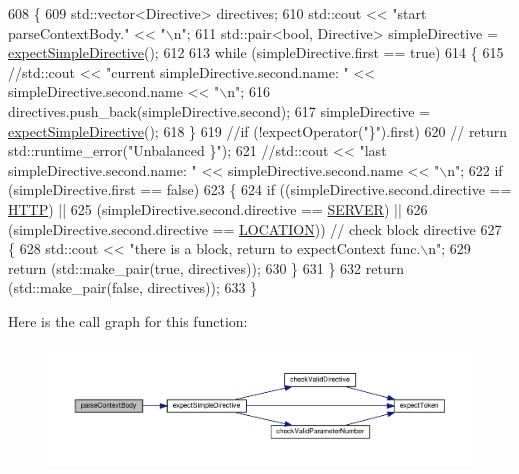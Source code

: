 \begin{DoxyCode}
608     \{
609         std::vector<Directive>  directives;
610         std::cout << \textcolor{stringliteral}{"start parseContextBody."} << \textcolor{stringliteral}{"\(\backslash\)n"};
611         std::pair<bool, Directive> simpleDirective = \hyperlink{classft_1_1_parser_a81d18b750d54e1e3002070531045171b}{expectSimpleDirective}();
612 
613         \textcolor{keywordflow}{while} (simpleDirective.first == \textcolor{keyword}{true})
614         \{
615             \textcolor{comment}{//std::cout << "current simpleDirective.second.name: " << simpleDirective.second.name << "\(\backslash\)n";}
616             directives.push\_back(simpleDirective.second);
617             simpleDirective = \hyperlink{classft_1_1_parser_a81d18b750d54e1e3002070531045171b}{expectSimpleDirective}();
618         \}
619         \textcolor{comment}{//if (!expectOperator("\}").first)}
620         \textcolor{comment}{//  return std::runtime\_error("Unbalanced \}");}
621         \textcolor{comment}{//std::cout << "last simpleDirective.second.name: " << simpleDirective.second.name << "\(\backslash\)n";}
622         \textcolor{keywordflow}{if} (simpleDirective.first == \textcolor{keyword}{false})
623         \{
624             \textcolor{keywordflow}{if} ((simpleDirective.second.directive == \hyperlink{namespaceft_a5a5554dff10f0dc50bae4cc5825ad75da67e044074f46e6cea22788527da5f02e}{HTTP}) ||
625                     (simpleDirective.second.directive == \hyperlink{namespaceft_a5a5554dff10f0dc50bae4cc5825ad75da67c96b24b23bcb408bae7626730a04b7}{SERVER}) ||
626                     (simpleDirective.second.directive == \hyperlink{namespaceft_a5a5554dff10f0dc50bae4cc5825ad75da1e9e3944b93fde52c7c92e1e15dcaf4a}{LOCATION})) \textcolor{comment}{// check block directive}
627             \{
628                 std::cout << \textcolor{stringliteral}{"there is a block, return to expectContext func.\(\backslash\)n"};
629                 \textcolor{keywordflow}{return} (std::make\_pair(\textcolor{keyword}{true}, directives));
630             \}
631         \}
632         \textcolor{keywordflow}{return} (std::make\_pair(\textcolor{keyword}{false}, directives));
633     \}
\end{DoxyCode}
Here is the call graph for this function\+:
\nopagebreak
\begin{figure}[H]
\begin{center}
\leavevmode
\includegraphics[width=350pt]{classft_1_1_parser_aa8d68b83134b46e4b9115d9acd0cbf57_cgraph}
\end{center}
\end{figure}
